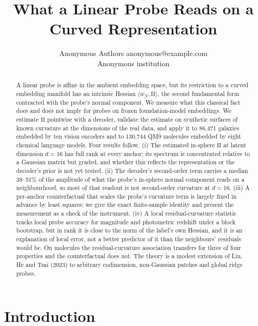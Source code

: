 \documentclass[10pt]{article}
\title{What a Linear Probe Reads on a Curved Representation}
\author{\name Anonymous Authors \email anonymous@example.com \\
      \addr Anonymous institution}
\newcommand{\II}{\mathrm{II}}
\begin{document}
\maketitle

\begin{abstract}
A linear probe is affine in the ambient embedding space, but its restriction to a curved embedding manifold has an intrinsic Hessian $\langle w_N,\II\rangle$, the second fundamental form contracted with the probe's normal component. We measure what this classical fact does and does not imply for probes on frozen foundation-model embeddings. We estimate $\II$ pointwise with a decoder, validate the estimate on synthetic surfaces of known curvature at the dimensions of the real data, and apply it to 86{,}471 galaxies embedded by ten vision encoders and to 130{,}744 QM9 molecules embedded by eight chemical language models. Four results follow. (i) The estimated in-sphere $\II$ at latent dimension $d=16$ has full rank at every anchor; its spectrum is concentrated relative to a Gaussian matrix but graded, and whether this reflects the representation or the decoder's prior is not yet tested. (ii) The decoder's second-order term carries a median 38--51\% of the amplitude of what the probe's in-sphere normal component reads on a neighbourhood, so most of that readout is not second-order curvature at $d=16$. (iii) A per-anchor counterfactual that scales the probe's curvature term is largely fixed in advance by least squares; we give the exact finite-sample identity and present the measurement as a check of the instrument. (iv) A local residual-curvature statistic tracks local probe accuracy for magnitude and photometric redshift under a block bootstrap, but in rank it is close to the norm of the label's own Hessian, and it is an explanation of local error, not a better predictor of it than the neighbours' residuals would be. On molecules the residual-curvature association transfers for three of four properties and the counterfactual does not. The theory is a modest extension of Liu, He and Tsai (2023) to arbitrary codimension, non-Gaussian patches and global ridge probes.
\end{abstract}

\section{Introduction}
\label{sec:intro}
\end{document}
